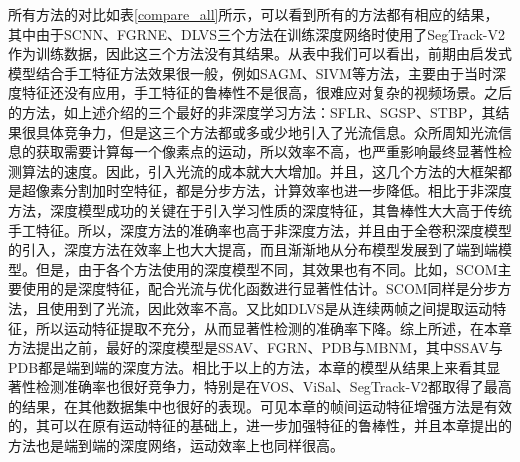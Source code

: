 所有方法的对比如表\ref{compare_all}所示，可以看到所有的方法都有相应的结果，其中由于SCNN、FGRNE、DLVS三个方法在训练深度网络时使用了SegTrack-V2作为训练数据，因此这三个方法没有其结果。从表中我们可以看出，前期由启发式模型结合手工特征方法效果很一般，例如SAGM、SIVM等方法，主要由于当时深度特征还没有应用，手工特征的鲁棒性不是很高，很难应对复杂的视频场景。之后的方法，如上述介绍的三个最好的非深度学习方法：SFLR、SGSP、STBP，其结果很具体竞争力，但是这三个方法都或多或少地引入了光流信息。众所周知光流信息的获取需要计算每一个像素点的运动，所以效率不高，也严重影响最终显著性检测算法的速度。因此，引入光流的成本就大大增加。并且，这几个方法的大框架都是超像素分割加时空特征，都是分步方法，计算效率也进一步降低。相比于非深度方法，深度模型成功的关键在于引入学习性质的深度特征，其鲁棒性大大高于传统手工特征。所以，深度方法的准确率也高于非深度方法，并且由于全卷积深度模型的引入，深度方法在效率上也大大提高，而且渐渐地从分布模型发展到了端到端模型。但是，由于各个方法使用的深度模型不同，其效果也有不同。比如，SCOM主要使用的是深度特征，配合光流与优化函数进行显著性估计。SCOM同样是分步方法，且使用到了光流，因此效率不高。又比如DLVS是从连续两帧之间提取运动特征，所以运动特征提取不充分，从而显著性检测的准确率下降。综上所述，在本章方法提出之前，最好的深度模型是SSAV、FGRN、PDB与MBNM，其中SSAV与PDB都是端到端的深度方法。相比于以上的方法，本章的模型从结果上来看其显著性检测准确率也很好竞争力，特别是在VOS、ViSal、SegTrack-V2都取得了最高的结果，在其他数据集中也很好的表现。可见本章的帧间运动特征增强方法是有效的，其可以在原有运动特征的基础上，进一步加强特征的鲁棒性，并且本章提出的方法也是端到端的深度网络，运动效率上也同样很高。

